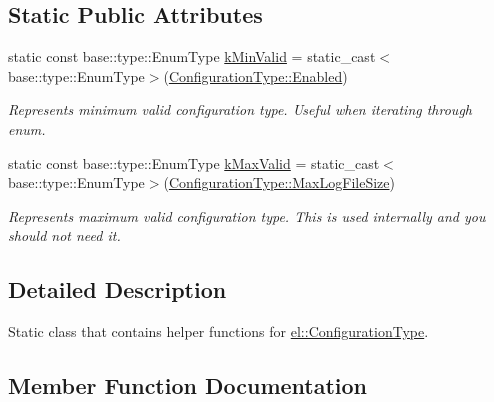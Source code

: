 \subsection*{Static Public Attributes}
\begin{DoxyCompactItemize}
\item 
\mbox{\label{classel_1_1_configuration_type_helper_ab7266e698eb32dec2da285325a66e322}} 
static const base\+::type\+::\+Enum\+Type \hyperlink{classel_1_1_configuration_type_helper_ab7266e698eb32dec2da285325a66e322}{k\+Min\+Valid} = static\+\_\+cast$<$base\+::type\+::\+Enum\+Type$>$(\hyperlink{namespaceel_a281f5db6d6163678bc68a8b23b59e124a00d23a76e43b46dae9ec7aa9dcbebb32}{Configuration\+Type\+::\+Enabled})
\begin{DoxyCompactList}\small\item\em Represents minimum valid configuration type. Useful when iterating through enum. \end{DoxyCompactList}\item 
\mbox{\label{classel_1_1_configuration_type_helper_aa02f3cefb127e7eb97d7e1dd7f51a12d}} 
static const base\+::type\+::\+Enum\+Type \hyperlink{classel_1_1_configuration_type_helper_aa02f3cefb127e7eb97d7e1dd7f51a12d}{k\+Max\+Valid} = static\+\_\+cast$<$base\+::type\+::\+Enum\+Type$>$(\hyperlink{namespaceel_a281f5db6d6163678bc68a8b23b59e124a4b35e615142d60db6383426f051e700b}{Configuration\+Type\+::\+Max\+Log\+File\+Size})
\begin{DoxyCompactList}\small\item\em Represents maximum valid configuration type. This is used internally and you should not need it. \end{DoxyCompactList}\end{DoxyCompactItemize}


\subsection{Detailed Description}
Static class that contains helper functions for \hyperlink{namespaceel_a281f5db6d6163678bc68a8b23b59e124}{el\+::\+Configuration\+Type}. 

\subsection{Member Function Documentation}
\mbox{\label{classel_1_1_configuration_type_helper_af4a35305e3941fd578e55fec624eba43}} 
